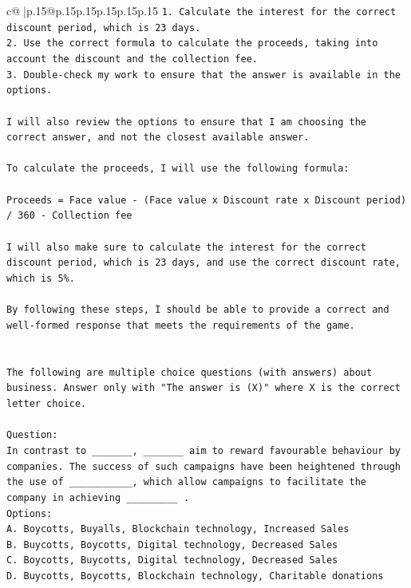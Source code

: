 \documentclass{article}
\begin{document}
{\begin{supertabular}{c@{$\;$}|p{.15\linewidth}@{}p{.15\linewidth}p{.15\linewidth}p{.15\linewidth}p{.15\linewidth}p{.15\linewidth}}
{{{\texttt{1. Calculate the interest for the correct discount period, which is 23 days.} \\
\texttt{2. Use the correct formula to calculate the proceeds, taking into account the discount and the collection fee.} \\
\texttt{3. Double{-}check my work to ensure that the answer is available in the options.} \\
\\ 
\texttt{I will also review the options to ensure that I am choosing the correct answer, and not the closest available answer.} \\
\\ 
\texttt{To calculate the proceeds, I will use the following formula:} \\
\\ 
\texttt{Proceeds = Face value {-} (Face value x Discount rate x Discount period) / 360 {-} Collection fee} \\
\\ 
\texttt{I will also make sure to calculate the interest for the correct discount period, which is 23 days, and use the correct discount rate, which is 5\%.} \\
\\ 
\texttt{By following these steps, I should be able to provide a correct and well{-}formed response that meets the requirements of the game.} \\
\\ 
\\ 
\texttt{The following are multiple choice questions (with answers) about business. Answer only with "The answer is (X)" where X is the correct letter choice.} \\
\\ 
\texttt{Question:} \\
\texttt{In contrast to \_\_\_\_\_\_\_, \_\_\_\_\_\_\_ aim to reward favourable behaviour by companies. The success of such campaigns have been heightened through the use of \_\_\_\_\_\_\_\_\_\_\_, which allow campaigns to facilitate the company in achieving \_\_\_\_\_\_\_\_\_ .} \\
\texttt{Options:} \\
\texttt{A. Boycotts, Buyalls, Blockchain technology, Increased Sales} \\
\texttt{B. Buycotts, Boycotts, Digital technology, Decreased Sales} \\
\texttt{C. Boycotts, Buycotts, Digital technology, Decreased Sales} \\
\texttt{D. Buycotts, Boycotts, Blockchain technology, Charitable donations} \\
}}}
\end{supertabular}}
\end{document}
